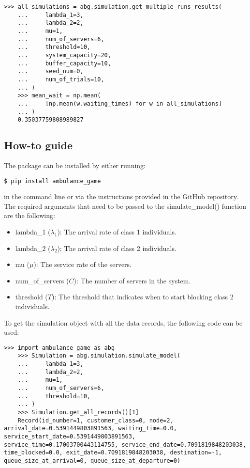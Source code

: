 \begin{lstlisting}[style=pystyle]
    >>> all_simulations = abg.simulation.get_multiple_runs_results(
    ...     lambda_1=3,
    ...     lambda_2=2,
    ...     mu=1,
    ...     num_of_servers=6,
    ...     threshold=10,
    ...     system_capacity=20,
    ...     buffer_capacity=10,
    ...     seed_num=0,
    ...     num_of_trials=10,
    ... )
    >>> mean_wait = np.mean(
    ...     [np.mean(w.waiting_times) for w in all_simulations]
    ... )
    0.35037759808989827
\end{lstlisting}


\subsection{How-to guide}

The package can be installed by either running:

\begin{lstlisting}[style=terminalstyle]
    $ pip install ambulance_game
\end{lstlisting}

in the command line or via the instructions provided in the GitHub repository.
The required arguments that need to be passed to the simulate\_model() function
are the following:
\begin{itemize}
    \item lambda\_1 (\(\lambda_1\)): The arrival rate of class 1 individuals.
    \item lambda\_2 (\(\lambda_2\)): The arrival rate of class 2 individuals.
    \item mu (\(\mu\)): The service rate of the servers.
    \item num\_of\_servers (\(C\)): The number of servers in the system.
    \item threshold (\(T\)): The threshold that indicates when to start blocking 
    class 2 individuals.
\end{itemize}

To get the simulation object with all the data records, the following code can be
used:
\begin{lstlisting}[style=pystyle]
    >>> import ambulance_game as abg
    >>> Simulation = abg.simulation.simulate_model(
    ...     lambda_1=3,
    ...     lambda_2=2,
    ...     mu=1,
    ...     num_of_servers=6,
    ...     threshold=10,
    ... )
    >>> Simulation.get_all_records()[1]
    Record(id_number=1, customer_class=0, node=2, arrival_date=0.5391449803891563, waiting_time=0.0, service_start_date=0.5391449803891563, service_time=0.17003700443114755, service_end_date=0.7091819848203038, time_blocked=0.0, exit_date=0.7091819848203038, destination=-1, queue_size_at_arrival=0, queue_size_at_departure=0)
\end{lstlisting}

